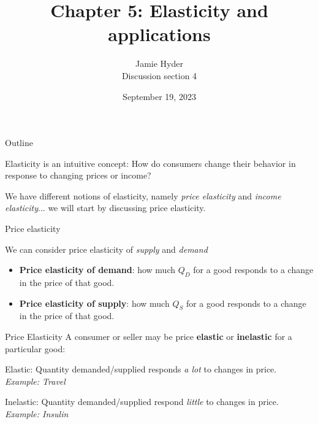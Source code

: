 \documentclass[compress]{beamer}
\title{Chapter 5: Elasticity and applications}
\author{Jamie Hyder \\
    Discussion section 4}
\date{September 19, 2023}
\begin{document}
\begin{frame}
    \titlepage 
\end{frame}

\begin{frame}{Outline}
    
    \begin{block}{Elasticity is an intuitive concept: }
        How do consumers change their behavior in response to changing prices or income?
    \end{block}

    \medskip

    We have different notions of elasticity, namely \textit{price elasticity} and \textit{income elasticity}... we will start by discussing price elasticity.
\end{frame}

\begin{frame}{Price elasticity}
    \begin{block}{We can consider price elasticity of \textit{supply} and \textit{demand}}
        \begin{itemize}
            \item \textbf{Price elasticity of demand}: how much $Q_D$ for a good responds to a change in the price of that good.
            \item \textbf{Price elasticity of supply}: how much $Q_S$ for a good responds to a change in the price of that good.
        \end{itemize}
    \end{block}
\end{frame}

\begin{frame}{Price Elasticity}
    A consumer or seller may be price \textbf{elastic} or \textbf{inelastic} for a particular good:
    \begin{block}{Elastic:}
        Quantity demanded/supplied responds \textit{a lot} to changes in price. \\
        \medskip
\textit{        Example: Travel
}    \end{block}
    \begin{block}{Inelastic:}
        Quantity demanded/supplied respond \textit{little} to changes in price. \\
        \medskip
\textit{        Example: Insulin
}    \end{block}
\end{frame}
\end{document}
